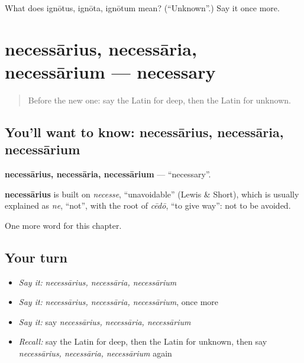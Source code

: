 \begin{tcolorbox}[breakable,colback=teal!4,colframe=teal!35!black,title={Before you move on}]
What does ignōtus, ignōta, ignōtum mean? (\textquotedblleft{}Unknown\textquotedblright{}.) Say it once more.
\end{tcolorbox}
\section[necessārius, necessāria, necessārium]{necessārius, necessāria, necessārium — necessary}

\label{lesson:LA-C240-necessarius}



\begin{quote}
Before the new one: say the Latin for deep, then the Latin for unknown.
\end{quote}

\subsection*{You'll want to know: necessārius, necessāria, necessārium}
\textbf{necessārius, necessāria, necessārium} — \textquotedblleft{}necessary\textquotedblright{}.

\begin{cousinweb}
\textbf{necessārius} is built on \emph{necesse}, \textquotedblleft{}unavoidable\textquotedblright{} (Lewis \& Short), which is usually explained as \emph{ne}, \textquotedblleft{}not\textquotedblright{}, with the root of \emph{cēdō}, \textquotedblleft{}to give way\textquotedblright{}: not to be avoided.
\end{cousinweb}

\begin{grammarlens}[title={What you've built}]
One more word for this chapter.
\end{grammarlens}

\subsection*{Your turn}
\begin{itemize}
\raggedright
  \item \emph{Say it:} \emph{necessārius, necessāria, necessārium}
  \item \emph{Say it:} \emph{necessārius, necessāria, necessārium}, once more
  \item \emph{Say it:} say \emph{necessārius, necessāria, necessārium}
  \item \emph{Recall:} say the Latin for deep, then the Latin for unknown, then say \emph{necessārius, necessāria, necessārium} again
\end{itemize}

